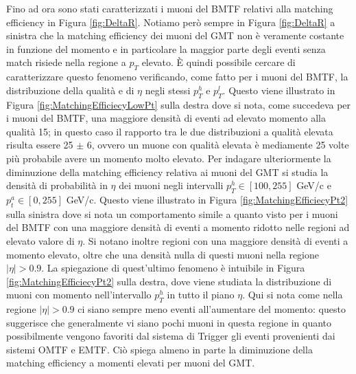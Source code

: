 Fino ad ora sono stati caratterizzati i muoni del BMTF relativi alla matching efficiency in Figura \ref{fig:DeltaR}. Notiamo però sempre in Figura \ref{fig:DeltaR} a sinistra che la matching efficiency dei muoni del GMT non è veramente costante in funzione del momento e in particolare la maggior parte degli eventi senza match risiede nella regione a $p_T$ elevato. È quindi possibile cercare di caratterizzare questo fenomeno verificando, come fatto per i muoni del BMTF, la distribuzione della qualità e di $\eta$ negli stessi $p_T^h$ e $p_T^l$. Questo viene illustrato in Figura \ref{fig:MatchingEfficiecyLowPt} sulla destra dove si nota, come succedeva per i muoni del BMTF, una maggiore densità di eventi ad elevato momento alla qualità 15; in questo caso il rapporto tra le due distribuzioni a qualità elevata risulta essere 25 $\pm$ 6, ovvero un muone con qualità elevata è mediamente 25 volte più probabile avere un momento molto elevato. \newline
Per indagare ulteriormente la diminuzione della matching efficiency relativa ai muoni del GMT si studia la densità di probabilità in $\eta$ dei muoni negli intervalli $p_T^h \in [100, 255]$ GeV/c e $p_t^a \in [0, 255]$ GeV/c. Questo viene illustrato in Figura \ref{fig:MatchingEfficiecyPt2} sulla sinistra dove si nota un comportamento simile a quanto visto per i muoni del BMTF con una maggiore densità di eventi a momento ridotto nelle regioni ad elevato valore di $\eta$. Si notano inoltre regioni con una maggiore densità di eventi a momento elevato, oltre che una densità nulla di questi muoni nella regione $|\eta| > 0.9$. La spiegazione di quest'ultimo fenomeno è intuibile in Figura \ref{fig:MatchingEfficiecyPt2} sulla destra, dove viene studiata la distribuzione di muoni con momento nell'intervallo $p_T^h$ in tutto il piano $\eta$. Qui si nota come nella regione $|\eta| > 0.9$ ci siano sempre meno eventi all'aumentare del momento: questo suggerisce che generalmente vi siano pochi muoni in questa regione in quanto possibilmente vengono favoriti dal sistema di Trigger gli eventi provenienti dai sistemi OMTF e EMTF. 
Ciò spiega almeno in parte la diminuzione della matching efficiency a momenti elevati per muoni del GMT.





